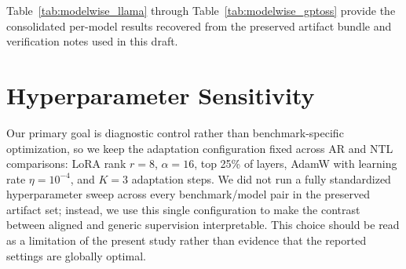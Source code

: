 Table~\ref{tab:modelwise_llama} through Table~\ref{tab:modelwise_gptoss} provide the consolidated per-model results recovered from the preserved artifact bundle and verification notes used in this draft.


\section{Hyperparameter Sensitivity}
\label{app:sensitivity}

Our primary goal is diagnostic control rather than benchmark-specific optimization, so we keep the adaptation configuration fixed across AR and NTL comparisons: LoRA rank $r{=}8$, $\alpha{=}16$, top 25\% of layers, AdamW with learning rate $\eta{=}10^{-4}$, and $K{=}3$ adaptation steps.
We did not run a fully standardized hyperparameter sweep across every benchmark/model pair in the preserved artifact set; instead, we use this single configuration to make the contrast between aligned and generic supervision interpretable.
This choice should be read as a limitation of the present study rather than evidence that the reported settings are globally optimal.
